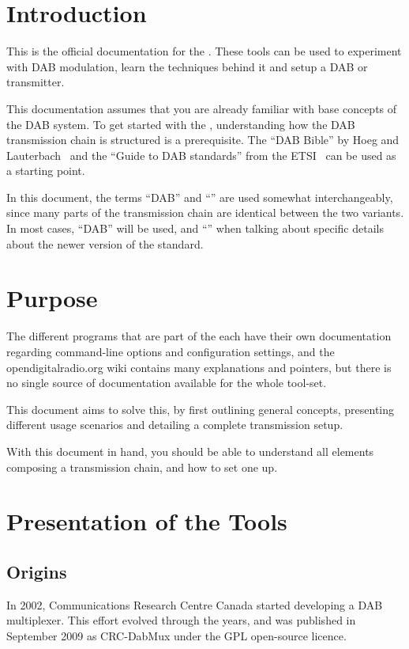 \section{Introduction}
This is the official documentation for the \mmbtools. These tools can be used to
experiment with DAB modulation, learn the techniques behind it and setup a DAB
or \dabplus transmitter.

This documentation assumes that you are already familiar with base concepts of
the DAB system. To get started with the \mmbtools, understanding how the DAB
transmission chain is structured is a prerequisite. The ``DAB Bible'' by Hoeg
and Lauterbach~\cite{hoeg} and the ``Guide to DAB standards'' from the
ETSI~\cite{etsidabguide} can be used as a starting point.

In this document, the terms ``DAB'' and ``\dabplus'' are used somewhat
interchangeably, since many parts of the transmission chain are identical
between the two variants. In most cases, ``DAB'' will be used, and ``\dabplus''
when talking about specific details about the newer version of the standard.


\section{Purpose}
The different programs that are part of the \mmbtools each have their own
documentation regarding command-line options and configuration settings, and the
opendigitalradio.org wiki
contains many explanations and pointers, but there is
no single source of documentation available for the whole tool-set.

This document aims to solve this, by first outlining general concepts,
presenting different usage scenarios and detailing a complete transmission
setup.

With this document in hand, you should be able to understand all elements
composing a \mmbtools transmission chain, and how to set one up.

\section{Presentation of the Tools}
\subsection{Origins}
In 2002, Communications Research Centre Canada
started developing a DAB multiplexer. This effort evolved through the years, and
was published in September 2009 as \mbox{CRC-DabMux} under the GPL
open-source licence.

